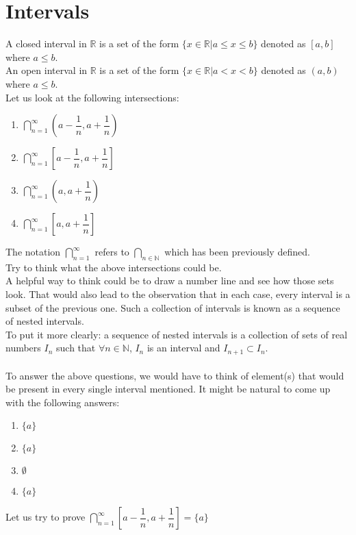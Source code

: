 \section{Intervals}\label{sec:intervals}
A closed interval in $\mathbb{R}$ is a set of the form $\{x\in\mathbb{R}|a\le x\le b\}$ denoted as $[a, b]$ where $a\le b$.\\
An open interval in $\mathbb{R}$ is a set of the form $\{x\in\mathbb{R}|a < x < b\}$ denoted as $(a, b)$ where $a\le b$.\\
Let us look at the following intersections:
\begin{enumerate}[nosep]
    \item $\displaystyle\bigcap_{n=1}^\infty\left(a-\dfrac{1}{n},a+\dfrac{1}{n}\right)$
    \item $\displaystyle\bigcap_{n=1}^\infty\left[a-\dfrac{1}{n},a+\dfrac{1}{n}\right]$
    \item $\displaystyle\bigcap_{n=1}^\infty\left(a,a+\dfrac{1}{n}\right)$
    \item $\displaystyle\bigcap_{n=1}^\infty\left[a,a+\dfrac{1}{n}\right]$
\end{enumerate}
The notation $\displaystyle\bigcap_{n=1}^\infty$ refers to $\displaystyle\bigcap_{n\in\mathbb{N}}$ which has been previously defined.\\
Try to think what the above intersections could be.\\
A helpful way to think could be to draw a number line and see how those sets look. That would also lead to the observation that in each case, every interval is a subset of the previous one. Such a collection of intervals is known as a sequence of nested intervals.\\
To put it more clearly: a sequence of nested intervals is a collection of sets of real numbers $I_n$ such that $\forall n\in \mathbb{N}$, $I_n$ is an interval and $I_{n+1}\subset I_n$.\\~\\
To answer the above questions, we would have to think of element(s) that would be present in every single interval mentioned. It might be natural to come up with the following answers:
\begin{enumerate}[nosep]
    \item $\{a\}$
    \item $\{a\}$
    \item $\emptyset$
    \item $\{a\}$
\end{enumerate}
Let us try to prove $\displaystyle \bigcap_{n=1}^\infty \left[a - \dfrac{1}{n}, a+\dfrac{1}{n}\right]=\{a\}$\\
